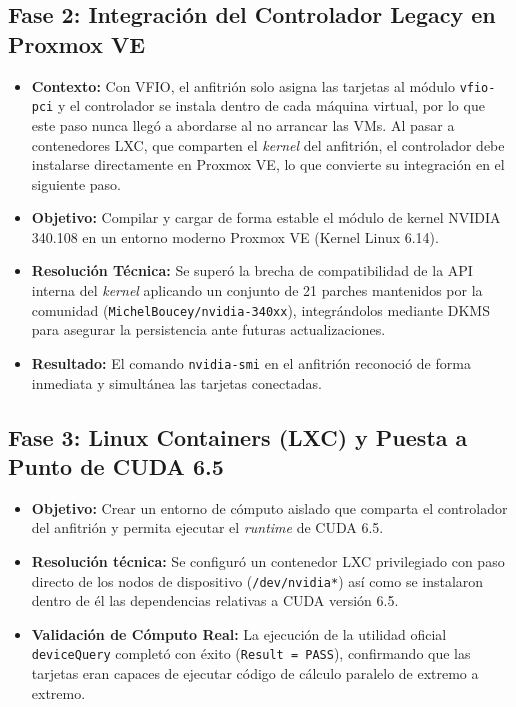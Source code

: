 \documentclass[a4paper,11pt]{article}
\begin{document}
\subsection*{Fase 2: Integración del Controlador Legacy en Proxmox VE}
\begin{itemize}[leftmargin=*,itemsep=2pt]
    \item \textbf{Contexto:} Con VFIO, el anfitrión solo asigna las tarjetas al módulo \texttt{vfio-pci} y el controlador se instala dentro de cada máquina virtual, por lo que este paso nunca llegó a abordarse al no arrancar las VMs. Al pasar a contenedores LXC, que comparten el \textit{kernel} del anfitrión, el controlador debe instalarse directamente en Proxmox VE, lo que convierte su integración en el siguiente paso.
    \item \textbf{Objetivo:} Compilar y cargar de forma estable el módulo de kernel NVIDIA 340.108 en un entorno moderno Proxmox VE (Kernel Linux 6.14).
    \item \textbf{Resolución Técnica:} Se superó la brecha de compatibilidad de la API interna del \textit{kernel} aplicando un conjunto de 21 parches mantenidos por la comunidad (\texttt{MichelBoucey/nvidia-340xx}), integrándolos mediante DKMS para asegurar la persistencia ante futuras actualizaciones.
    \item \textbf{Resultado:} El comando \texttt{nvidia-smi} en el anfitrión reconoció de forma inmediata y simultánea 
    las tarjetas conectadas.
\end{itemize}

\subsection*{Fase 3: Linux Containers (LXC) y Puesta a Punto de CUDA 6.5}
\begin{itemize}[leftmargin=*,itemsep=2pt]
    \item \textbf{Objetivo:} Crear un entorno de cómputo aislado que comparta el controlador del anfitrión y permita ejecutar el \textit{runtime} de CUDA 6.5.
    \item \textbf{Resolución técnica:} Se configuró un contenedor LXC privilegiado con paso directo de los
     nodos de dispositivo (\texttt{/dev/nvidia*}) así como se instalaron dentro de él las dependencias relativas a CUDA 
     versión 6.5.
    \item \textbf{Validación de Cómputo Real:} La ejecución de la utilidad oficial \texttt{deviceQuery} completó con éxito (\texttt{Result = PASS}), confirmando que las tarjetas eran capaces de ejecutar código de cálculo paralelo de extremo a extremo.
\end{itemize}
\end{document}
